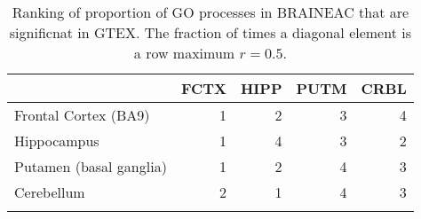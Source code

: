\begin{longtable}{lrrrr}
  \hline
 & FCTX & HIPP & PUTM & CRBL \\ 
  \hline
Frontal Cortex (BA9) & 1 & 2 & 3 & 4 \\ 
  Hippocampus & 1 & 4 & 3 & 2 \\ 
  Putamen (basal ganglia) & 1 & 2 & 4 & 3 \\ 
  Cerebellum & 2 & 1 & 4 & 3 \\ 
   \hline
\hline
\caption{Ranking of proportion of GO processes in BRAINEAC that are significnat in GTEX. The fraction of times a diagonal element is a row maximum $r=0.5$. } 
\label{RankGO}
\end{longtable}
